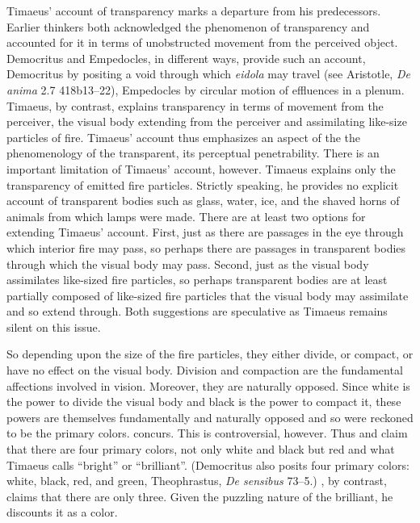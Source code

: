 Timaeus' account of transparency marks a departure from his predecessors. Earlier thinkers both acknowledged the phenomenon of transparency and accounted for it in terms of unobstructed movement from the perceived object. Democritus and Empedocles, in different ways, provide such an account, Democritus by positing a void through which \emph{eidola} may travel (see Aristotle, \emph{De anima} 2.7 418b13–22), Empedocles by circular motion of effluences in a plenum. Timaeus, by contrast, explains transparency in terms of movement from the perceiver, the visual body extending from the perceiver and assimilating like-size particles of fire. Timaeus' account thus emphasizes an aspect of the the phenomenology of the transparent, its perceptual penetrability. There is an important limitation of Timaeus' account, however. Timaeus explains only the transparency of emitted fire particles. Strictly speaking, he provides no explicit account of transparent bodies such as glass, water, ice, and the shaved horns of animals from which lamps were made. There are at least two options for extending Timaeus' account. First, just as there are passages in the eye through which interior fire may pass, so perhaps there are passages in transparent bodies through which the visual body may pass. Second, just as the visual body assimilates like-sized fire particles, so perhaps transparent bodies are at least partially composed of like-sized fire particles that the visual body may assimilate and so extend through. Both suggestions are speculative as Timaeus remains silent on this issue.


So depending upon the size of the fire particles, they either divide, or compact, or have no effect on the visual body. Division and compaction are the fundamental affections involved in vision. Moreover, they are naturally opposed. Since white is the power to divide the visual body and black is the power to compact it, these powers are themselves fundamentally and naturally opposed and so were reckoned to be the primary colors. \citet[480--1]{Taylor:1928qb} concurs. This is controversial, however. Thus \citet{Brisson:1997qr} and \citet{Ierodiakonou:2005ly} claim that there are four primary colors, not only white and black but red and what Timaeus calls ``bright'' or ``brilliant''. (Democritus also posits four primary colors: white, black, red, and green, Theophrastus, \emph{De sensibus} 73--5.) \citet[277]{Cornford:1935fk}, by contrast, claims that there are only three. Given the puzzling nature of the brilliant, he discounts it as a color.

